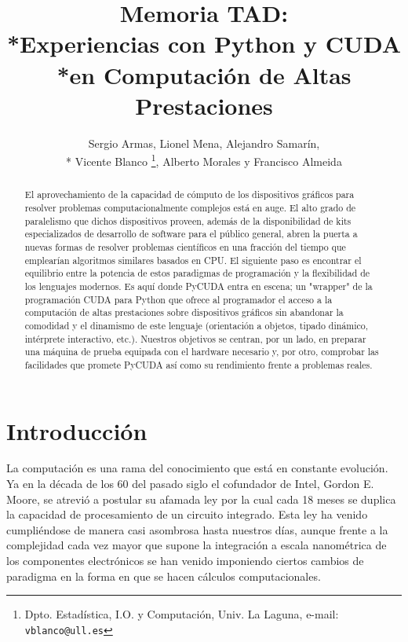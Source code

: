 \documentclass[twoside]{article}
\begin{document}

\title{Memoria TAD:\\*Experiencias con Python y CUDA\\*en Computación de Altas Prestaciones}

\author{Sergio Armas, %
     Lionel Mena, %
     Alejandro Samarín,\\*%
     Vicente Blanco%
     \thanks{Dpto. Estadística, I.O. y Computación, Univ. La Laguna, e-mail: {\tt vblanco@ull.es}}, %
     Alberto Morales y %
     Francisco Almeida
}

\maketitle
\markboth{}{}
\pagestyle{empty} 
\thispagestyle{empty} %

\begin{abstract}
El aprovechamiento de la capacidad de cómputo de los dispositivos gráficos para resolver problemas computacionalmente complejos está en auge. El alto grado de paralelismo que dichos dispositivos proveen, además de la disponibilidad de kits especializados de desarrollo de software para el público general, abren la puerta a nuevas formas de resolver problemas científicos en una fracción del tiempo que emplearían algoritmos similares basados en CPU. El siguiente paso es encontrar el equilibrio entre la potencia de estos paradigmas de programación y la flexibilidad de los lenguajes modernos. Es aquí donde PyCUDA entra en escena; un "wrapper" de la programación CUDA para Python que ofrece al programador el acceso a la computación de altas prestaciones sobre dispositivos gráficos sin abandonar la comodidad y el dinamismo de este lenguaje (orientación a objetos, tipado dinámico, intérprete interactivo, etc.). Nuestros objetivos se centran, por un lado, en preparar una máquina de prueba equipada con el hardware necesario y, por otro, comprobar las facilidades que promete PyCUDA así como su rendimiento frente a problemas reales.
\end{abstract}


\section{Introducción}
La computación es una rama del conocimiento que está en constante evolución. Ya en la década de los 60 del pasado siglo el cofundador de Intel, Gordon E. Moore, se atrevió a postular su afamada ley por la cual cada 18 meses se duplica la capacidad de procesamiento de un circuito integrado. Esta ley ha venido cumpliéndose de manera casi asombrosa hasta nuestros días, aunque frente a la complejidad cada vez mayor que supone la integración a escala nanométrica de los componentes electrónicos se han venido imponiendo ciertos cambios de paradigma en la forma en que se hacen cálculos computacionales.
\end{document}
